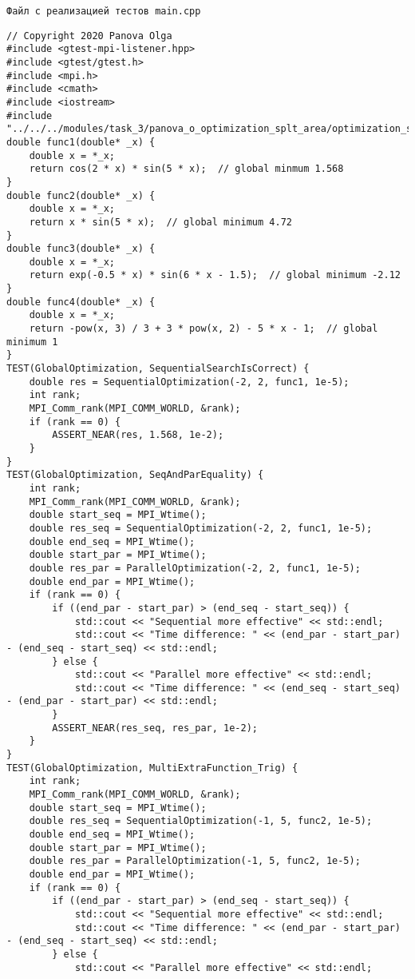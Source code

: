 \documentclass{report}
\begin{document}
\texttt{Файл с реализацией тестов main.cpp}
\begin{lstlisting}
// Copyright 2020 Panova Olga
#include <gtest-mpi-listener.hpp>
#include <gtest/gtest.h>
#include <mpi.h>
#include <cmath>
#include <iostream>
#include "../../../modules/task_3/panova_o_optimization_splt_area/optimization_split_area.h"
double func1(double* _x) {
    double x = *_x;
    return cos(2 * x) * sin(5 * x);  // global minmum 1.568
}
double func2(double* _x) {
    double x = *_x;
    return x * sin(5 * x);  // global minimum 4.72
}
double func3(double* _x) {
    double x = *_x;
    return exp(-0.5 * x) * sin(6 * x - 1.5);  // global minimum -2.12
}
double func4(double* _x) {
    double x = *_x;
    return -pow(x, 3) / 3 + 3 * pow(x, 2) - 5 * x - 1;  // global minimum 1
}
TEST(GlobalOptimization, SequentialSearchIsCorrect) {
    double res = SequentialOptimization(-2, 2, func1, 1e-5);
    int rank;
    MPI_Comm_rank(MPI_COMM_WORLD, &rank);
    if (rank == 0) {
        ASSERT_NEAR(res, 1.568, 1e-2);
    }
}
TEST(GlobalOptimization, SeqAndParEquality) {
    int rank;
    MPI_Comm_rank(MPI_COMM_WORLD, &rank);
    double start_seq = MPI_Wtime();
    double res_seq = SequentialOptimization(-2, 2, func1, 1e-5);
    double end_seq = MPI_Wtime();
    double start_par = MPI_Wtime();
    double res_par = ParallelOptimization(-2, 2, func1, 1e-5);
    double end_par = MPI_Wtime();
    if (rank == 0) {
        if ((end_par - start_par) > (end_seq - start_seq)) {
            std::cout << "Sequential more effective" << std::endl;
            std::cout << "Time difference: " << (end_par - start_par) - (end_seq - start_seq) << std::endl;
        } else {
            std::cout << "Parallel more effective" << std::endl;
            std::cout << "Time difference: " << (end_seq - start_seq) - (end_par - start_par) << std::endl;
        }
        ASSERT_NEAR(res_seq, res_par, 1e-2);
    }
}
TEST(GlobalOptimization, MultiExtraFunction_Trig) {
    int rank;
    MPI_Comm_rank(MPI_COMM_WORLD, &rank);
    double start_seq = MPI_Wtime();
    double res_seq = SequentialOptimization(-1, 5, func2, 1e-5);
    double end_seq = MPI_Wtime();
    double start_par = MPI_Wtime();
    double res_par = ParallelOptimization(-1, 5, func2, 1e-5);
    double end_par = MPI_Wtime();
    if (rank == 0) {
        if ((end_par - start_par) > (end_seq - start_seq)) {
            std::cout << "Sequential more effective" << std::endl;
            std::cout << "Time difference: " << (end_par - start_par) - (end_seq - start_seq) << std::endl;
        } else {
            std::cout << "Parallel more effective" << std::endl;

\end{lstlisting}
\end{document}

